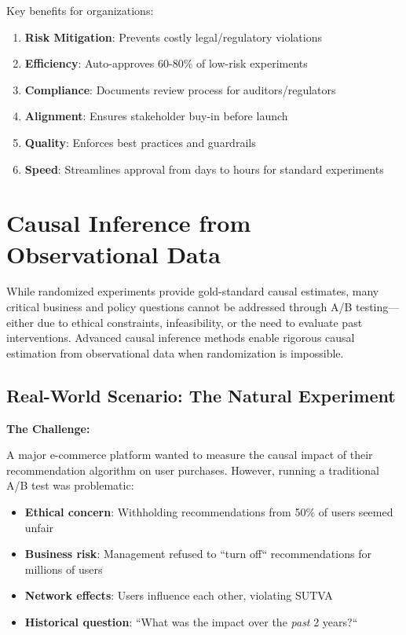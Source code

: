 Key benefits for organizations:
\begin{enumerate}
    \item \textbf{Risk Mitigation}: Prevents costly legal/regulatory violations
    \item \textbf{Efficiency}: Auto-approves 60-80\% of low-risk experiments
    \item \textbf{Compliance}: Documents review process for auditors/regulators
    \item \textbf{Alignment}: Ensures stakeholder buy-in before launch
    \item \textbf{Quality}: Enforces best practices and guardrails
    \item \textbf{Speed}: Streamlines approval from days to hours for standard experiments
\end{enumerate}

\section{Causal Inference from Observational Data}

While randomized experiments provide gold-standard causal estimates, many critical business and policy questions cannot be addressed through A/B testing---either due to ethical constraints, infeasibility, or the need to evaluate past interventions. Advanced causal inference methods enable rigorous causal estimation from observational data when randomization is impossible.

\subsection{Real-World Scenario: The Natural Experiment}

\textbf{The Challenge:}

A major e-commerce platform wanted to measure the causal impact of their recommendation algorithm on user purchases. However, running a traditional A/B test was problematic:

\begin{itemize}
    \item \textbf{Ethical concern}: Withholding recommendations from 50\% of users seemed unfair
    \item \textbf{Business risk}: Management refused to ``turn off`` recommendations for millions of users
    \item \textbf{Network effects}: Users influence each other, violating SUTVA
    \item \textbf{Historical question}: ``What was the impact over the \textit{past} 2 years?``
\end{itemize}

